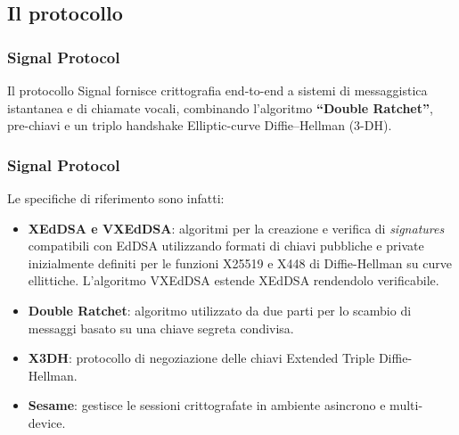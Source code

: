 \subsection{Il protocollo}

\begin{frame}
    \frametitle{Signal Protocol}
    Il protocollo Signal fornisce crittografia end-to-end a sistemi di messaggistica istantanea e di chiamate vocali, combinando l'algoritmo \textbf{``Double Ratchet''}, pre-chiavi e un triplo handshake Elliptic-curve Diffie–Hellman (3-DH). 
\end{frame}

\begin{frame}
    \frametitle{Signal Protocol}
    Le specifiche di riferimento sono infatti: \cite{signal}
    \begin{itemize}
        \item \textbf{XEdDSA e VXEdDSA}: algoritmi per la creazione e verifica di \textit{signatures} compatibili con EdDSA utilizzando formati di chiavi pubbliche e private inizialmente definiti per le funzioni X25519 e X448 di Diffie-Hellman su curve ellittiche. L'algoritmo VXEdDSA estende XEdDSA rendendolo verificabile.\pause
        \item \textbf{Double Ratchet}: algoritmo utilizzato da due parti per lo scambio di messaggi basato su una chiave segreta condivisa. \pause
        \item \textbf{X3DH}: protocollo di negoziazione delle chiavi Extended Triple Diffie-Hellman.\pause
        \item \textbf{Sesame}: gestisce le sessioni crittografate in ambiente asincrono e multi-device.
    \end{itemize}
    
\end{frame}
